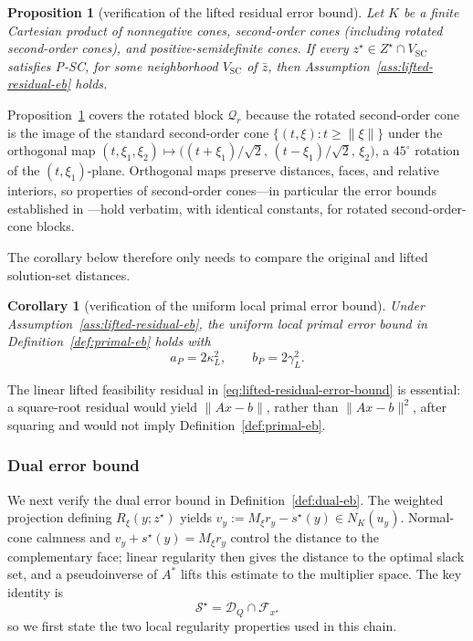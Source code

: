 \documentclass[letterpaper]{article} %
\newtheorem{proposition}[theorem]{Proposition}
\newtheorem{corollary}[theorem]{Corollary}
\theoremstyle{definition}
\theoremstyle{remark}
\begin{document}
\begin{proposition}[verification of the lifted residual error bound]
\label{prop:lifted-eb}
Let $K$ be a finite Cartesian product of nonnegative cones, second-order
cones (including rotated second-order cones), and positive-semidefinite
cones.  If every $z^\star\in Z^\star\cap V_{\mathrm{SC}}$ satisfies P-SC,
for some neighborhood $V_{\mathrm{SC}}$ of $\bar z$, then
Assumption~\ref{ass:lifted-residual-eb} holds.
\end{proposition}

Proposition~\ref{prop:lifted-eb} covers the rotated block $\mathcal Q_r$
because the rotated second-order cone is the image of the standard
second-order cone $\{(t,\xi):t\ge\|\xi\|\}$ under the orthogonal map
$(t,\xi_1,\xi_2)\mapsto
\bigl((t+\xi_1)/\sqrt2,\,(t-\xi_1)/\sqrt2,\,\xi_2\bigr)$, a $45^\circ$
rotation of the $(t,\xi_1)$-plane.  Orthogonal maps preserve distances,
faces, and relative interiors, so properties of second-order cones---in
particular the error bounds established in \cite{ding2023strict}---hold
verbatim, with identical constants, for rotated second-order-cone blocks.

The corollary below therefore only needs to compare the original and
lifted solution-set distances.

\begin{corollary}[verification of the uniform local primal error bound]
\label{cor:primal-eb-strict-complementarity}
Under Assumption~\ref{ass:lifted-residual-eb}, the uniform local primal
error bound in Definition~\ref{def:primal-eb} holds with
\[
    a_P=2\kappa_L^2,
    \qquad
    b_P=2\gamma_L^2.
\]
\end{corollary}

The linear lifted feasibility residual in
\eqref{eq:lifted-residual-error-bound} is essential: a square-root residual
would yield $\|Ax-b\|$, rather than $\|Ax-b\|^2$, after squaring and would
not imply Definition~\ref{def:primal-eb}.

\subsubsection{Dual error bound}

We next verify the dual error bound in Definition~\ref{def:dual-eb}.  The
weighted projection defining $R_\xi(y;z^\star)$ yields
$v_y:=M_\xi r_y-s^\star(y)\in N_K(u_y)$.  Normal-cone calmness and
$v_y+s^\star(y)=M_\xi r_y$ control the distance to the complementary face;
linear regularity then gives the distance to the optimal slack set, and a
pseudoinverse of $A^*$ lifts this estimate to the multiplier space.  The key
identity is
\[
    \mathcal S^\star
    =
    \mathcal D_Q\cap\mathcal F_{x^\star}
\]
so we first state the two local regularity properties used in this chain.
\end{document}
